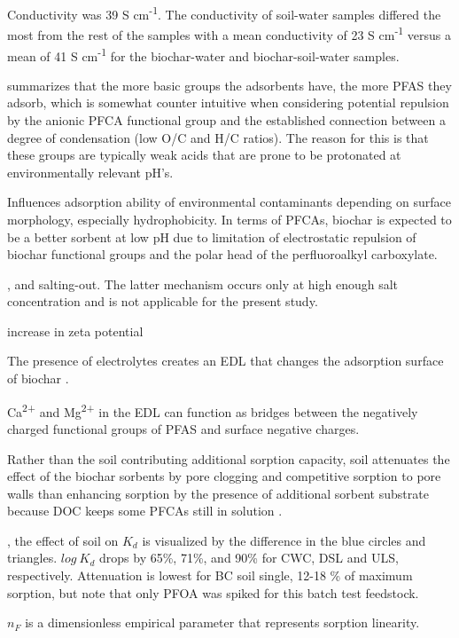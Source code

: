  Conductivity was 39  \textmu S cm\textsuperscript{-1}. The conductivity of soil-water samples differed the most from the rest of the samples with a mean conductivity of 23  \textmu S cm\textsuperscript{-1} versus a mean of 41  \textmu S cm\textsuperscript{-1} for the biochar-water and biochar-soil-water samples. 
 
 \cite{du2014adsorption} summarizes that the more basic groups the adsorbents have, the more PFAS they adsorb, which is somewhat counter intuitive when considering potential repulsion by the anionic PFCA functional group and the established connection between a degree of condensation (low O/C and H/C ratios). The reason for this is that these groups are typically weak acids that are prone to be protonated at environmentally relevant pH's. 
 
 Influences adsorption ability of environmental contaminants depending on surface morphology, especially hydrophobicity. In terms of PFCAs, biochar is expected to be a better sorbent at low pH due to limitation of electrostatic repulsion of biochar functional groups and the polar head of the perfluoroalkyl carboxylate. 
 
 , and salting-out. The latter mechanism occurs only at high enough salt concentration and is not applicable for the present study. 
 
 increase in zeta potential
 
 The presence of electrolytes creates an EDL that changes the adsorption surface of biochar \citep{du2014adsorption}.
 
 Ca\textsuperscript{2+} and Mg\textsuperscript{2+} in the EDL can function as bridges between the negatively charged functional groups of PFAS and surface negative charges.
 
Rather than the soil contributing additional sorption capacity, soil attenuates the effect of the biochar sorbents by pore clogging and competitive sorption to pore walls than enhancing sorption by the presence of additional sorbent substrate because DOC keeps some PFCAs still in solution \citep{Li2019}.
 
, the effect of soil on $K_d$ is visualized by the difference in the blue circles and triangles. $log~K_d$ drops by 65\%, 71\%, and 90\% for CWC, DSL and ULS, respectively. Attenuation is lowest for BC soil single, 12-18 \% of maximum sorption, but note that only PFOA was spiked for this batch test feedstock.
  
$n_F$ is a dimensionless empirical parameter that represents sorption linearity.

